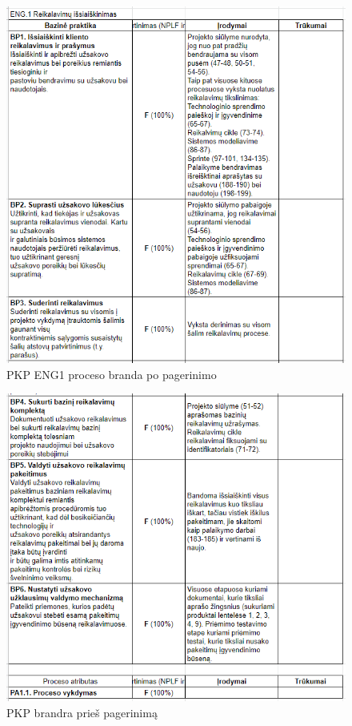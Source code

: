 \documentclass{VUMIFPSkursinis}
\begin{document}
	\begin{figure}[htbp]
		\includegraphics[scale=1]{img/eng1one}
		\caption{PKP ENG1  proceso branda po pagerinimo} %
		\label{img:pkpPries}
	\end{figure}

	\begin{figure}[htbp]
		\includegraphics[scale=1]{img/eng1two}
		\caption{PKP brandra prieš pagerinimą} %
		\label{img:pkpPries}
	\end{figure}
\end{document}
